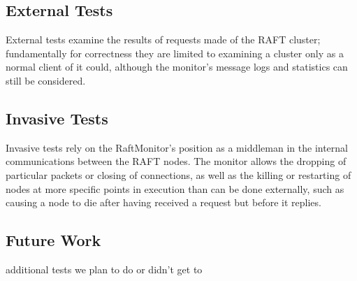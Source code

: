 \documentclass[UTF8]{article}
\begin{document}
\subsection{External Tests}
External tests examine the results of requests made of the RAFT cluster; fundamentally for correctness they are limited to examining a cluster only as a normal client of it could, although the monitor's message logs and statistics can still be considered.

\subsection{Invasive Tests}
Invasive tests rely on the RaftMonitor's position as a middleman in the internal communications between the RAFT nodes. The monitor allows the dropping of particular packets or closing of connections, as well as the killing or restarting of nodes at more specific points in execution than can be done externally, such as causing a node to die after having received a request but before it replies.

\subsection{Future Work}

additional tests we plan to do or didn't get to




\end{document}
